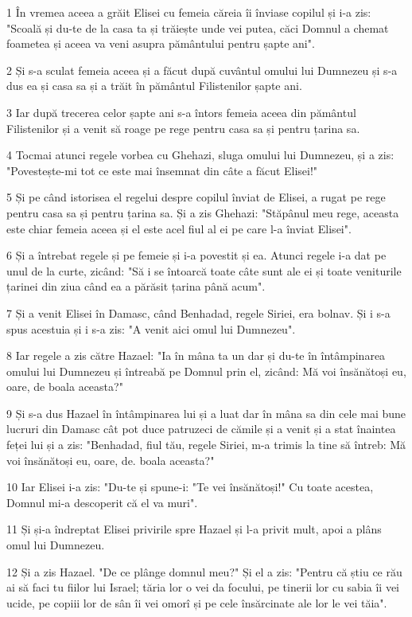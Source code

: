 \par 1 În vremea aceea a grăit Elisei cu femeia căreia îi înviase copilul și i-a zis: "Scoală și du-te de la casa ta și trăiește unde vei putea, căci Domnul a chemat foametea și aceea va veni asupra pământului pentru șapte ani".
\par 2 Și s-a sculat femeia aceea și a făcut după cuvântul omului lui Dumnezeu și s-a dus ea și casa sa și a trăit în pământul Filistenilor șapte ani.
\par 3 Iar după trecerea celor șapte ani s-a întors femeia aceea din pământul Filistenilor și a venit să roage pe rege pentru casa sa și pentru țarina sa.
\par 4 Tocmai atunci regele vorbea cu Ghehazi, sluga omului lui Dumnezeu, și a zis: "Povestește-mi tot ce este mai însemnat din câte a făcut Elisei!"
\par 5 Și pe când istorisea el regelui despre copilul înviat de Elisei, a rugat pe rege pentru casa sa și pentru țarina sa. Și a zis Ghehazi: "Stăpânul meu rege, aceasta este chiar femeia aceea și el este acel fiul al ei pe care l-a înviat Elisei".
\par 6 Și a întrebat regele și pe femeie și i-a povestit și ea. Atunci regele i-a dat pe unul de la curte, zicând: "Să i se întoarcă toate câte sunt ale ei și toate veniturile țarinei din ziua când ea a părăsit țarina până acum".
\par 7 Și a venit Elisei în Damasc, când Benhadad, regele Siriei, era bolnav. Și i s-a spus acestuia și i s-a zis: "A venit aici omul lui Dumnezeu".
\par 8 Iar regele a zis către Hazael: "Ia în mâna ta un dar și du-te în întâmpinarea omului lui Dumnezeu și întreabă pe Domnul prin el, zicând: Mă voi însănătoși eu, oare, de boala aceasta?"
\par 9 Și s-a dus Hazael în întâmpinarea lui și a luat dar în mâna sa din cele mai bune lucruri din Damasc cât pot duce patruzeci de cămile și a venit și a stat înaintea feței lui și a zis: "Benhadad, fiul tău, regele Siriei, m-a trimis la tine să întreb: Mă voi însănătoși eu, oare, de. boala aceasta?"
\par 10 Iar Elisei i-a zis: "Du-te și spune-i: "Te vei însănătoși!" Cu toate acestea, Domnul mi-a descoperit că el va muri".
\par 11 Și și-a îndreptat Elisei privirile spre Hazael și l-a privit mult, apoi a plâns omul lui Dumnezeu.
\par 12 Și a zis Hazael. "De ce plânge domnul meu?" Și el a zis: "Pentru că știu ce rău ai să faci tu fiilor lui Israel; tăria lor o vei da focului, pe tinerii lor cu sabia îi vei ucide, pe copiii lor de sân îi vei omorî și pe cele însărcinate ale lor le vei tăia".
